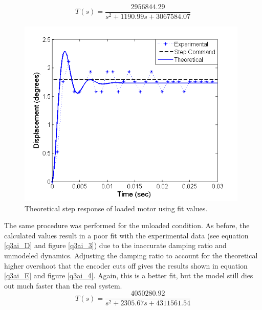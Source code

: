 \documentclass{article}
\theoremstyle{plain}
\theoremstyle{definition}
\theoremstyle{remark}
\begin{document}
\begin{equation}
\label{q3ai_C}
T(s) = \frac{2956844.29}{s^2 + 1190.99 s + 3067584.07}
\end{equation}

\begin{figure}[hbt]
\begin{center}
\includegraphics[width = 11cm]{LoadedStepFit.png}
\caption{Theoretical step response of loaded motor using fit values.}
\label{q3ai_2}
\end{center}
\end{figure}
\vspace{5mm}
The same procedure was performed for the unloaded condition. As before, the calculated values result in a poor fit with the experimental data (see equation \ref{q3ai_D} and figure \ref{q3ai_3})  due to the inaccurate damping ratio and unmodeled dynamics. Adjusting the damping ratio to account for the theoretical higher overshoot that the encoder cuts off gives the results shown in equation \ref{q3ai_E} and figure \ref{q3ai_4}. Again, this is a better fit, but the model still dies out much faster than the real system.\\

\begin{equation}
\label{q3ai_D}
T(s) = \frac{4050280.92}{s^2 + 2305.67 s + 4311561.54}
\end{equation}
\end{document}
